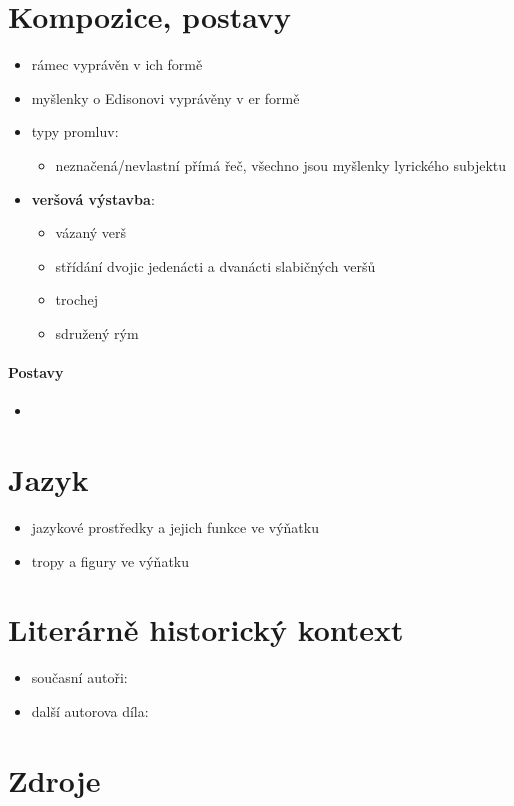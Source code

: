 \documentclass[10pt,a4paper]{article}
\begin{document}
\section*{Kompozice, postavy}
\begin{itemize}
\item rámec vyprávěn v ich formě 
\item myšlenky o Edisonovi vyprávěny v er formě
\item typy promluv:
	\begin{itemize}
	\item neznačená/nevlastní přímá řeč, všechno jsou myšlenky lyrického subjektu
	\end{itemize}
\item \textbf{veršová výstavba}:	
	 \begin{itemize}
	 \item vázaný verš
	 \item střídání dvojic jedenácti a dvanácti slabičných veršů
	 \item trochej
	 \item sdružený rým
	 \end{itemize}
\end{itemize}

\paragraph{Postavy}
\begin{itemize}
\item
\end{itemize}
\section*{Jazyk}
\begin{itemize}
\item jazykové prostředky a jejich funkce ve výňatku
\item tropy a figury ve výňatku
\end{itemize}
\section*{Literárně historický kontext}
\begin{itemize}
\item současní autoři:
\item další autorova díla:
\end{itemize}
\section*{Zdroje}
\end{document}
